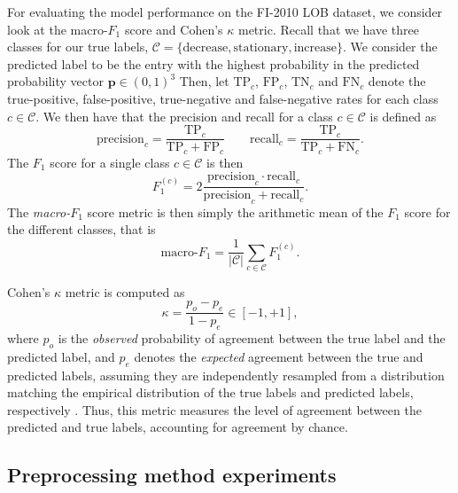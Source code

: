\documentclass{statsmsc}
\begin{document}
{For evaluating the model performance on the FI-2010 \ac{LOB} dataset, we consider look at the
macro-$F_1$ score and Cohen's $\kappa$ metric.
Recall that we have three classes for our true labels,
$\mathcal{C}=\{\textrm{decrease}, \textrm{stationary}, \textrm{increase}\}$.
We consider the predicted label to be the entry with the highest probability in the predicted
probability vector $\mathbf{p} \in (0,1)^3$
Then, let $\textrm{TP}_c$, $\textrm{FP}_c$, $\textrm{TN}_c$
and $\textrm{FN}_c$ denote the true-positive, false-positive, true-negative and
false-negative rates for each class $c \in \mathcal{C}$. We then have that the precision and
recall for a class $c \in \mathcal{C}$ is defined as
\begin{equation}
    \textrm{precision}_c= \frac{\textrm{TP}_c}{\textrm{TP}_c+\textrm{FP}_c}
    \qquad \textrm{recall}_c=\frac{\textrm{TP}_c}{\textrm{TP}_c+\textrm{FN}_c}.
\end{equation}
The $F_1$ score for a single class $c \in \mathcal{C}$ is then
\begin{equation}
    F_1^{(c)}=2\frac{\textrm{precision}_c  \cdot \textrm{recall}_c}{\textrm{precision}_c+\textrm{recall}_c} .
\end{equation}
The \textit{macro-}$F_1$ score metric is then simply the arithmetic mean of the $F_1$ score for
the different classes, that is
\begin{equation}
    \textrm{macro-}F_1=\frac{1}{|\mathcal{C}|}  \sum^{}_{c \in \mathcal{C}}  F_1^{(c)}.
\end{equation}

Cohen's $\kappa$ metric is computed as
\begin{equation}
    \kappa=\frac{p_o-p_e}{1-p_e} \in [-1,+1],
\end{equation}
where $p_o$ is the \textit{observed} probability of agreement between the true label and the
predicted label, and $p_e$ denotes the \textit{expected} agreement between the true and predicted
labels, assuming they are independently resampled from a distribution matching the empirical
distribution of the true labels and predicted labels, respectively \citep{kappa}.
Thus, this metric measures the level of agreement between the predicted and true labels,
accounting for agreement by chance.


\subsection{Preprocessing method experiments}%
\label{sub:Preprocessing method experiments}

}
\end{document}
